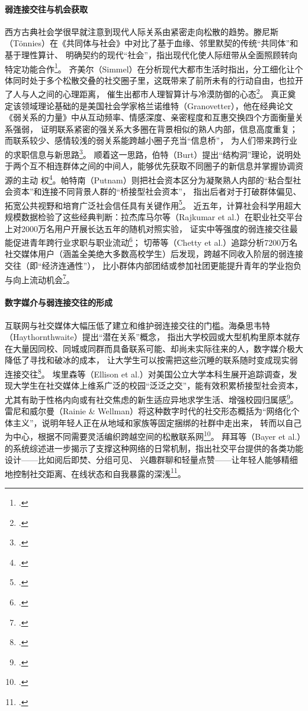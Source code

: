 \paragraph{弱连接交往与机会获取}
西方古典社会学很早就注意到现代人际关系由紧密走向松散的趋势。滕尼斯（Tönnies）在《共同体与社会》中对比了基于血缘、邻里默契的传统“共同体”和基于理性算计、
明确契约的现代“社会”，指出现代化使人际纽带从全面照顾转向特定功能合作\footcite{Tonnies2019}。
齐美尔（Simmel）在分析现代大都市生活时指出，分工细化让个体同时处于多个松散交叠的社交圈子里，这既带来了前所未有的行动自由，也拉开了人与人之间的心理距离，
催生出都市人理智算计与冷漠防御的心态\footcite{Simmel2002}。
真正奠定该领域理论基础的是美国社会学家格兰诺维特（Granovetter），他在经典论文《弱关系的力量》中从互动频率、情感深度、亲密程度和互惠交换四个方面衡量关系强弱，
证明联系紧密的强关系大多圈在背景相似的熟人内部，信息高度重复；而联系较少、感情较浅的弱关系能跨越小圈子充当“信息桥”，
为人们带来跨行业的求职信息与新思路\footcite{Granovetter1973}。
顺着这一思路，伯特（Burt）提出“结构洞”理论，说明处于两个互不相连群体之间的中间人，能够优先获取不同圈子的新信息并掌握协调资源的主动
权\footcite{Burt1992}。帕特南（Putnam）则把社会资本区分为凝聚熟人内部的“粘合型社会资本”和连接不同背景人群的“桥接型社会资本”，
指出后者对于打破群体偏见、拓宽公共视野和培育广泛社会信任具有关键作用\footcite{Putnam2000}。
近五年，计算社会科学用超大规模数据检验了这些经典判断：拉杰库马尔等（Rajkumar et al.）在职业社交平台上对2000万名用户开展长达五年的随机对照实验，
证实中等强度的弱连接交往最能促进青年跨行业求职与职业流动\footcite{Rajkumar2022}；
切蒂等（Chetty et al.）追踪分析7200万名社交媒体用户（涵盖全美绝大多数高校学生）后发现，跨越不同收入阶层的弱连接交往（即“经济连通性”），
比小群体内部团结或参加社团更能提升青年的学业抱负与向上流动机会\footcite{Chetty2022}。

\paragraph{数字媒介与弱连接交往的形成}
互联网与社交媒体大幅压低了建立和维护弱连接交往的门槛。海桑思韦特（Haythornthwaite）提出“潜在关系”概念，
指出大学校园或大型机构里原本就存在大量因同校、同城或同群而具备联系可能、却尚未实际往来的人，数字媒介极大降低了寻找和破冰的成本，
让大学生可以按需把这些沉睡的联系随时变成现实弱连接交往\footcite{Haythornthwaite2005}。
埃里森等（Ellison et al.）对美国公立大学本科生展开追踪调查，发现大学生在社交媒体上维系广泛的校园“泛泛之交”，能有效积累桥接型社会资本，
尤其有助于性格内向或有社交焦虑的新生适应异地求学生活、增强校园归属感\footcite{Ellison2007}。
雷尼和威尔曼（Rainie \& Wellman）将这种数字时代的社交形态概括为“网络化个体主义”，说明年轻人正在从地域和家族等固定捆绑的社群中走出来，
转而以自己为中心，根据不同需要灵活编织跨越空间的松散联系网\footcite{Rainie2012}。
拜耳等（Bayer et al.）的系统综述进一步揭示了支撑这种网络的日常机制，指出社交平台提供的各类功能设计——比如阅后即焚、分组可见、
兴趣群聊和轻量点赞——让年轻人能够精细地控制社交距离、在线状态和自我暴露的深浅\footcite{Bayer2020}。

